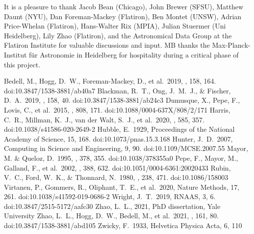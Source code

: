 \documentclass[modern]{aastex631}
\newcommand{\project}[1]{\textsl{#1}}
\begin{document}
\software{
\project{numpy} \citep{numpy} ---
\project{matplotlib} \citep{matplotlib} ---
\project{scipy} \citep{scipy}
}

\begin{acknowledgments}
It is a pleasure to thank
  Jacob Bean (Chicago),
  John Brewer (SFSU),
  Matthew Daunt (NYU),
  Dan Foreman-Mackey (Flatiron),
  Ben Montet (UNSW),
  Adrian Price-Whelan (Flatiron),
  Hans-Walter Rix (MPIA),
  Julian Stuermer (Uni Heidelberg),
  Lily Zhao (Flatiron),
and the Astronomical Data Group at the Flatiron Institute for valuable discussions and input.
MB thanks the Max-Planck-Institut f\"ur Astronomie in Heidelberg
for hospitality during a critical phase of this project.
\end{acknowledgments}

\begin{thebibliography}{dummy}
   Bedell, M., Hogg, D.~W., Foreman-Mackey, D., et al.\ 2019, \aj, 158, 164. doi:10.3847/1538-3881/ab40a7
   Blackman, R.~T., Ong, J.~M.~J., \& Fischer, D.~A.\ 2019, \aj, 158, 40. doi:10.3847/1538-3881/ab24c3
   Dumusque, X., Pepe, F., Lovis, C., et al.\ 2015, \apj, 808, 171. doi:10.1088/0004-637X/808/2/171
   Harris, C.~R., Millman, K.~J., van der Walt, S.~J., et al.\ 2020, \nat, 585, 357. doi:10.1038/s41586-020-2649-2
   Hubble, E.\ 1929, Proceedings of the National Academy of Science, 15, 168. doi:10.1073/pnas.15.3.168
   Hunter, J.~D.\ 2007, Computing in Science and Engineering, 9, 90. doi:10.1109/MCSE.2007.55
   Mayor, M. \& Queloz, D.\ 1995, \nat, 378, 355. doi:10.1038/378355a0
   Pepe, F., Mayor, M., Galland, F., et al.\ 2002, \aap, 388, 632. doi:10.1051/0004-6361:20020433
   Rubin, V.~C., Ford, W.~K., \& Thonnard, N.\ 1980, \apj, 238, 471. doi:10.1086/158003
   Virtanen, P., Gommers, R., Oliphant, T.~E., et al.\ 2020, Nature Methods, 17, 261. doi:10.1038/s41592-019-0686-2
   Wright, J.~T.\ 2019, RNAAS, 3, 6. doi:10.3847/2515-5172/aafc30
   Zhao, L.~L., 2021, PhD dissertation, Yale University
   Zhao, L.~L., Hogg, D.~W., Bedell, M., et al.\ 2021, \aj, 161, 80. doi:10.3847/1538-3881/abd105
   Zwicky, F.\ 1933, Helvetica Physica Acta, 6, 110
\end{thebibliography}
\end{document}
